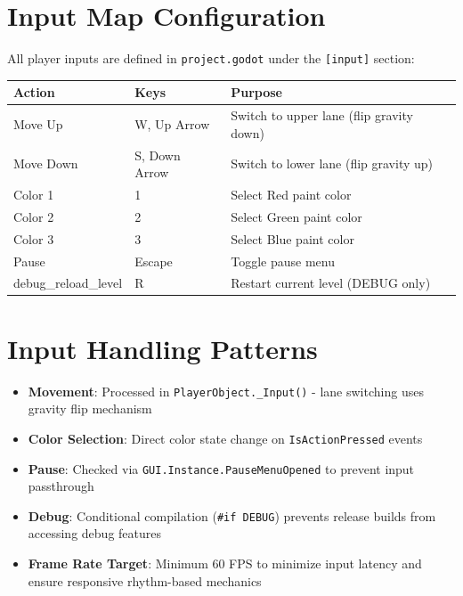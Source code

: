 \documentclass{report}
\begin{document}
\section{Input Map Configuration}
All player inputs are defined in \texttt{project.godot} under the \texttt{[input]} section:

\begin{longtable}{|l|l|p{6cm}|}
	\hline
	\textbf{Action}      & \textbf{Keys} & \textbf{Purpose}                         \\
	\hline
	Move Up              & W, Up Arrow   & Switch to upper lane (flip gravity down) \\
	\hline
	Move Down            & S, Down Arrow & Switch to lower lane (flip gravity up)   \\
	\hline
	Color 1              & 1             & Select Red paint color                   \\
	\hline
	Color 2              & 2             & Select Green paint color                 \\
	\hline
	Color 3              & 3             & Select Blue paint color                  \\
	\hline
	Pause                & Escape        & Toggle pause menu                        \\
	\hline
	debug\_reload\_level & R             & Restart current level (DEBUG only)       \\
	\hline
\end{longtable}

\section{Input Handling Patterns}
\begin{itemize}[noitemsep]
	\item \textbf{Movement}: Processed in \texttt{PlayerObject.\_Input()} - lane switching uses gravity flip mechanism
	\item \textbf{Color Selection}: Direct color state change on \texttt{IsActionPressed} events
	\item \textbf{Pause}: Checked via \texttt{GUI.Instance.PauseMenuOpened} to prevent input passthrough
	\item \textbf{Debug}: Conditional compilation (\texttt{\#if DEBUG}) prevents release builds from accessing debug features
	\item \textbf{Frame Rate Target}: Minimum 60 FPS to minimize input latency and ensure responsive rhythm-based mechanics
\end{itemize}
\end{document}
